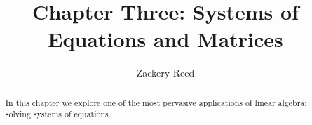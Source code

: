 \documentclass{xourse}
\title{Chapter Three: Systems of Equations and Matrices}
\author{Zackery Reed}
\begin{document}
\begin{abstract}
    In this chapter we explore one of the most pervasive applications of linear algebra: solving systems of equations.
\end{abstract}
\maketitle

\sectionstyle
{}
\end{document}
